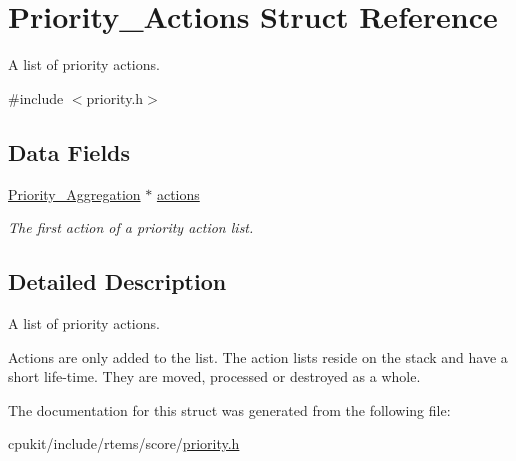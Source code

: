 \hypertarget{structPriority__Actions}{}\section{Priority\+\_\+\+Actions Struct Reference}
\label{structPriority__Actions}


A list of priority actions.  




{\ttfamily \#include $<$priority.\+h$>$}

\subsection*{Data Fields}
\begin{DoxyCompactItemize}
\item 
\mbox{\label{structPriority__Actions_a275c7362328fd65cd92058a469e5edff}} 
\mbox{\hyperlink{structPriority__Aggregation}{Priority\+\_\+\+Aggregation}} $\ast$ \mbox{\hyperlink{structPriority__Actions_a275c7362328fd65cd92058a469e5edff}{actions}}
\begin{DoxyCompactList}\small\item\em The first action of a priority action list. \end{DoxyCompactList}\end{DoxyCompactItemize}


\subsection{Detailed Description}
A list of priority actions. 

Actions are only added to the list. The action lists reside on the stack and have a short life-\/time. They are moved, processed or destroyed as a whole. 

The documentation for this struct was generated from the following file\+:\begin{DoxyCompactItemize}
\item 
cpukit/include/rtems/score/\mbox{\hyperlink{rtems_2score_2priority_8h}{priority.\+h}}\end{DoxyCompactItemize}
